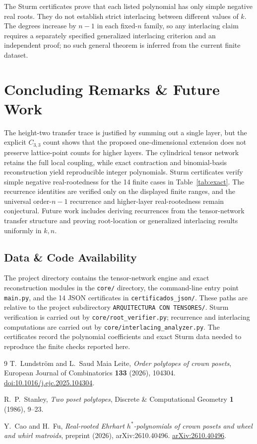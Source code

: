 \documentclass[11pt,a4paper]{article}
\theoremstyle{definition}
\begin{document}
The Sturm certificates prove that each listed polynomial has only simple
negative real roots. They do not establish strict interlacing between
different values of $k$. The degrees increase by $n-1$ in each fixed-$n$
family, so any interlacing claim requires a separately specified
generalized interlacing criterion and an independent proof; no such
general theorem is inferred from the current finite dataset.

\section{Concluding Remarks \& Future Work}

The height-two transfer trace is justified by summing out a single layer, but the explicit $C_{3,3}$ count shows that the proposed one-dimensional extension does not preserve lattice-point counts for higher layers. The cylindrical tensor network retains the full local coupling, while exact contraction and binomial-basis reconstruction yield reproducible integer polynomials. Sturm certificates verify simple negative real-rootedness for the 14 finite cases in Table~\ref{tab:exact}. The recurrence identities are verified only on the displayed finite ranges, and the universal order-$n-1$ recurrence and higher-layer real-rootedness remain conjectural. Future work includes deriving recurrences from the tensor-network transfer structure and proving root-location or generalized interlacing results uniformly in $k,n$.

\subsection{Data \& Code Availability}

The project directory contains the tensor-network engine and exact
reconstruction modules in the \texttt{core/} directory, the command-line
entry point \texttt{main.py}, and the 14 JSON certificates in
\texttt{certificados\_json/}. These paths are relative to the project
subdirectory \texttt{ARQUITECTURA CON TENSORES/}. Sturm verification is
carried out by \texttt{core/root\_verifier.py}; recurrence and
interlacing computations are carried out by
\texttt{core/interlacing\_analyzer.py}. The certificates record the
polynomial coefficients and exact Sturm data needed to reproduce the
finite checks reported here.

\begin{thebibliography}{9}
T.~Lundstr\"om and L.~Saud Maia Leite,
\emph{Order polytopes of crown posets},
European Journal of Combinatorics \textbf{133} (2026), 104304.
\href{https://doi.org/10.1016/j.ejc.2025.104304}{doi:10.1016/j.ejc.2025.104304}.

R.~P.~Stanley,
\emph{Two poset polytopes},
Discrete \& Computational Geometry \textbf{1} (1986), 9--23.

Y.~Cao and H.~Fu,
\emph{Real-rooted Ehrhart $h^*$-polynomials of crown posets and wheel and whirl matroids},
preprint (2026), arXiv:2610.40496.
\href{https://arxiv.org/abs/2610.40496}{arXiv:2610.40496}.
\end{thebibliography}
\end{document}
